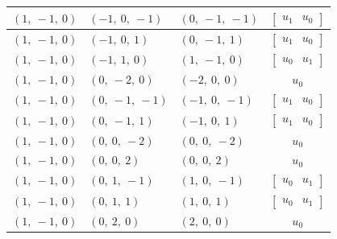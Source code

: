 \documentclass[11pt]{article}
\theoremstyle{definition}
\begin{document}
\begin{longtable}{|l|l|l|c|}
    \hline
    $\left( 1, \  -1, \  0\right)$ & $\left( -1, \  0, \  -1\right)$ & $\left( 0, \  -1, \  -1\right)$ & $\left[\begin{matrix}u_{1} & u_{0}\end{matrix}\right]$ \\
    \hline
    $\left( 1, \  -1, \  0\right)$ & $\left( -1, \  0, \  1\right)$ & $\left( 0, \  -1, \  1\right)$ & $\left[\begin{matrix}u_{1} & u_{0}\end{matrix}\right]$ \\
    \hline
    $\left( 1, \  -1, \  0\right)$ & $\left( -1, \  1, \  0\right)$ & $\left( 1, \  -1, \  0\right)$ & $\left[\begin{matrix}u_{0} & u_{1}\end{matrix}\right]$ \\
    \hline
    $\left( 1, \  -1, \  0\right)$ & $\left( 0, \  -2, \  0\right)$ & $\left( -2, \  0, \  0\right)$ & $u_{0}$ \\
    \hline
    $\left( 1, \  -1, \  0\right)$ & $\left( 0, \  -1, \  -1\right)$ & $\left( -1, \  0, \  -1\right)$ & $\left[\begin{matrix}u_{1} & u_{0}\end{matrix}\right]$ \\
    \hline
    $\left( 1, \  -1, \  0\right)$ & $\left( 0, \  -1, \  1\right)$ & $\left( -1, \  0, \  1\right)$ & $\left[\begin{matrix}u_{1} & u_{0}\end{matrix}\right]$ \\
    \hline
    $\left( 1, \  -1, \  0\right)$ & $\left( 0, \  0, \  -2\right)$ & $\left( 0, \  0, \  -2\right)$ & $u_{0}$ \\
    \hline
    $\left( 1, \  -1, \  0\right)$ & $\left( 0, \  0, \  2\right)$ & $\left( 0, \  0, \  2\right)$ & $u_{0}$ \\
    \hline
    $\left( 1, \  -1, \  0\right)$ & $\left( 0, \  1, \  -1\right)$ & $\left( 1, \  0, \  -1\right)$ & $\left[\begin{matrix}u_{0} & u_{1}\end{matrix}\right]$ \\
    \hline
    $\left( 1, \  -1, \  0\right)$ & $\left( 0, \  1, \  1\right)$ & $\left( 1, \  0, \  1\right)$ & $\left[\begin{matrix}u_{0} & u_{1}\end{matrix}\right]$ \\
    \hline
    $\left( 1, \  -1, \  0\right)$ & $\left( 0, \  2, \  0\right)$ & $\left( 2, \  0, \  0\right)$ & $u_{0}$ \\

\end{longtable}
\end{document}
